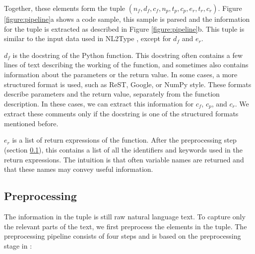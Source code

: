 Together, these elements form the tuple $(n_f, d_f, c_f, n_p, t_p, c_p, e_r, t_r, c_r)$. Figure \ref{figure:pipeline}a shows a code sample, this sample is parsed and the information for the tuple is extracted as described in Figure \ref{figure:pipeline}b. This tuple is similar to the input data used in NL2Type \cite{Malik2019NL2Type:Information}, except for $d_f$ and $e_r$.

$d_f$ is the docstring of the Python function. This docstring often contains a few lines of text describing the working of the function, and sometimes also contains information about the parameters or the return value. In some cases, a more structured format is used, such as ReST, Google, or NumPy style. These formats describe parameters and the return value, separately from the function description. In these cases, we can extract this information for $c_f$, $c_p$, and $c_r$. We extract these comments only if the docstring is one of the structured formats mentioned before.

$e_r$ is a list of return expressions of the function. After the preprocessing step (section \ref{method:preprocess}), this contains a list of all the identifiers and keywords used in the return expressions. The intuition is that often variable names are returned and that these names may convey useful information. 

\subsection{Preprocessing} \label{method:preprocess}
The information in the tuple is still raw natural language text. To capture only the relevant parts of the text, we first preprocess the elements in the tuple. The preprocessing pipeline consists of four steps and is based on the preprocessing stage in \cite{Malik2019NL2Type:Information}:

